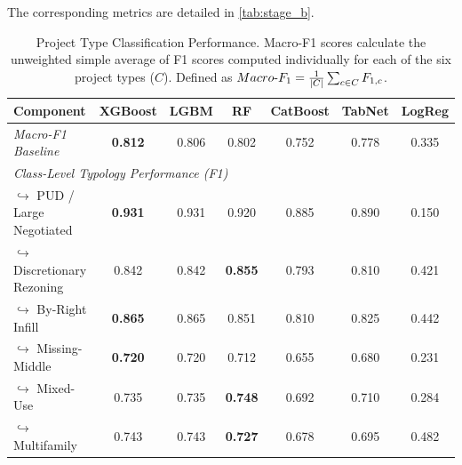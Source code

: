 

The corresponding metrics are detailed in \autoref{tab:stage_b}.

\begin{table}[H]
\centering
\caption[Project Type and Scale]{Project Type Classification Performance. Macro-F1 scores calculate the unweighted simple average of F1 scores computed individually for each of the six project types ($C$). Defined as $Macro\textnormal{-}F_1 = \frac{1}{|C|} \sum_{c \in C} F_{1,c}$.}
\label{tab:stage_b}
\begin{tabular}{lcccccc}
\toprule
\textbf{Component} & \textbf{XGBoost} & \textbf{LGBM} & \textbf{RF} & \textbf{CatBoost} & \textbf{TabNet} & \textbf{LogReg} \\
\midrule
\textit{Macro-F1 Baseline} & \textbf{0.812} & 0.806 & 0.802 & 0.752 & 0.778 & 0.335 \\
\midrule
\multicolumn{7}{l}{\textit{Class-Level Typology Performance (F1)}} \\
$\hookrightarrow$ PUD / Large Negotiated & \textbf{0.931} & 0.931 & 0.920 & 0.885 & 0.890 & 0.150 \\
$\hookrightarrow$ Discretionary Rezoning & 0.842 & 0.842 & \textbf{0.855} & 0.793 & 0.810 & 0.421 \\
$\hookrightarrow$ By-Right Infill & \textbf{0.865} & 0.865 & 0.851 & 0.810 & 0.825 & 0.442 \\
$\hookrightarrow$ Missing-Middle & \textbf{0.720} & 0.720 & 0.712 & 0.655 & 0.680 & 0.231 \\
$\hookrightarrow$ Mixed-Use & 0.735 & 0.735 & \textbf{0.748} & 0.692 & 0.710 & 0.284 \\
$\hookrightarrow$ Multifamily & 0.743 & 0.743 & \textbf{0.727} & 0.678 & 0.695 & 0.482 \\
\bottomrule
\end{tabular}
\end{table}